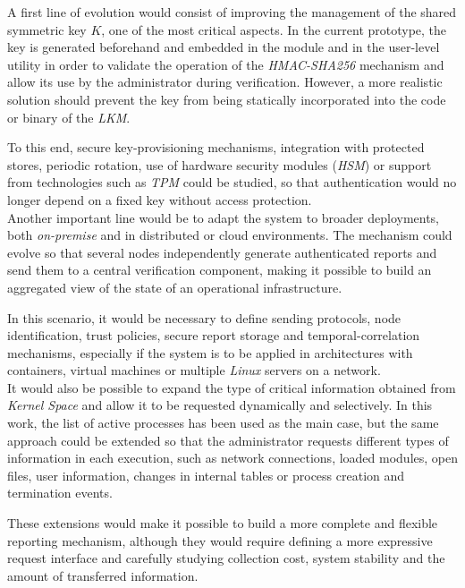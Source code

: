 A first line of evolution would consist of improving the management of the shared symmetric key \(K\), one of the most critical aspects.
In the current prototype, the key is generated beforehand and embedded in the module and in the user-level utility in order to validate the operation of the \textit{HMAC-SHA256} mechanism and allow its use by the administrator during verification.
However, a more realistic solution should prevent the key from being statically incorporated into the code or binary of the \textit{LKM}.

To this end, secure key-provisioning mechanisms, integration with protected stores, periodic rotation, use of hardware security modules (\textit{HSM}) or support from technologies such as \textit{TPM} could be studied, so that authentication would no longer depend on a fixed key without access protection.\\

Another important line would be to adapt the system to broader deployments, both \textit{on-premise} and in distributed or cloud environments.
The mechanism could evolve so that several nodes independently generate authenticated reports and send them to a central verification component, making it possible to build an aggregated view of the state of an operational infrastructure.

In this scenario, it would be necessary to define sending protocols, node identification, trust policies, secure report storage and temporal-correlation mechanisms, especially if the system is to be applied in architectures with containers, virtual machines or multiple \textit{Linux} servers on a network.\\

It would also be possible to expand the type of critical information obtained from \textit{Kernel Space} and allow it to be requested dynamically and selectively.
In this work, the list of active processes has been used as the main case, but the same approach could be extended so that the administrator requests different types of information in each execution, such as network connections, loaded modules, open files, user information, changes in internal tables or process creation and termination events.

These extensions would make it possible to build a more complete and flexible reporting mechanism, although they would require defining a more expressive request interface and carefully studying collection cost, system stability and the amount of transferred information.\\

